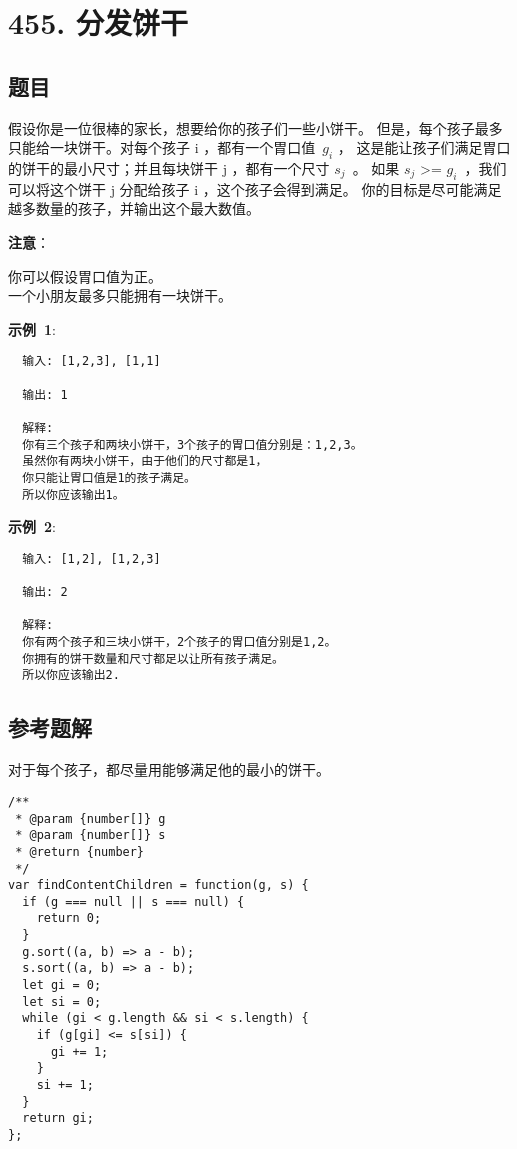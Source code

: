 \newpage
\section{455. 分发饼干}
\label{leetcode:455}

\subsection{题目}

假设你是一位很棒的家长，想要给你的孩子们一些小饼干。
但是，每个孩子最多只能给一块饼干。对每个孩子 i ，都有一个胃口值 $g_{i}$ ，
这是能让孩子们满足胃口的饼干的最小尺寸；并且每块饼干 j ，都有一个尺寸 $s_{j}$ 。
如果 $s_{j}$ >= $g_{i}$ ，我们可以将这个饼干 j 分配给孩子 i ，这个孩子会得到满足。
你的目标是尽可能满足越多数量的孩子，并输出这个最大数值。

\textbf{注意}：

你可以假设胃口值为正。\\
一个小朋友最多只能拥有一块饼干。

\textbf{示例 1}:

\begin{verbatim}
  输入: [1,2,3], [1,1]

  输出: 1

  解释: 
  你有三个孩子和两块小饼干，3个孩子的胃口值分别是：1,2,3。
  虽然你有两块小饼干，由于他们的尺寸都是1，
  你只能让胃口值是1的孩子满足。
  所以你应该输出1。
\end{verbatim}

\textbf{示例 2}:

\begin{verbatim}
  输入: [1,2], [1,2,3]

  输出: 2

  解释: 
  你有两个孩子和三块小饼干，2个孩子的胃口值分别是1,2。
  你拥有的饼干数量和尺寸都足以让所有孩子满足。
  所以你应该输出2.
\end{verbatim}

\subsection{参考题解}

对于每个孩子，都尽量用能够满足他的最小的饼干。

\begin{verbatim}
/**
 * @param {number[]} g
 * @param {number[]} s
 * @return {number}
 */
var findContentChildren = function(g, s) {
  if (g === null || s === null) {
    return 0;
  }
  g.sort((a, b) => a - b);
  s.sort((a, b) => a - b);
  let gi = 0;
  let si = 0;
  while (gi < g.length && si < s.length) {
    if (g[gi] <= s[si]) {
      gi += 1;
    }
    si += 1;
  }
  return gi;
};
\end{verbatim}
